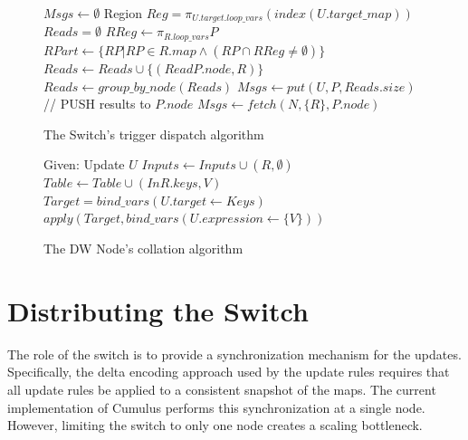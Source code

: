\begin{figure}
\begin{algorithmic}[1]
\STATE $Msgs \leftarrow \emptyset$
	\STATE Region $Reg = \pi_{U.target.loop\_vars} \left(index(U.target\_map)\right)$
		\STATE $Reads = \emptyset$
			\STATE $RReg \leftarrow \pi_{R.loop\_vars} P$
			\STATE $RPart \leftarrow \{RP | RP\in R.map \wedge (RP \cap RReg \neq \emptyset)\}$
			\STATE $Reads \leftarrow Reads \cup \{(ReadP.node, R)\}$
		\ENDFOR
		\STATE $Reads \leftarrow group\_by\_node(Reads)$
		\STATE $Msgs \leftarrow put(U, P, Reads.size)$
		  \STATE // PUSH results to $P.node$
			\STATE $Msgs \leftarrow fetch(N, \{R\}, P.node)$
		\ENDFOR
	\ENDFOR
\ENDFOR
\end{algorithmic}
\caption{The Switch's trigger dispatch algorithm}
\label{alg:dispatch}
\end{figure}


\begin{figure}
\begin{algorithmic}[1]
\STATE Given: Update $U$
	\STATE $Inputs \leftarrow Inputs \cup (R, \emptyset)$
\ENDFOR
{}
			\STATE $Table \leftarrow Table \cup (InR.keys, V)$
		\ENDIF
	\ENDFOR
\ENDFOR
{}
	\STATE $Target = bind\_vars(U.target \leftarrow Keys)$
	\STATE $apply(Target, bind\_vars(U.expression \leftarrow \{V\}))$
\ENDFOR
\end{algorithmic}
\caption{The DW Node's collation algorithm}
\label{alg:collation}
\end{figure}


\section{Distributing the Switch}
\label{sec:distswitch}


The role of the switch is to provide a synchronization mechanism for the updates.  Specifically, the delta encoding approach used by the update rules requires that all update rules be applied to a consistent snapshot of the maps.  The current implementation of Cumulus performs this synchronization at a single node.  However, limiting the switch to only one node creates a scaling bottleneck.  

